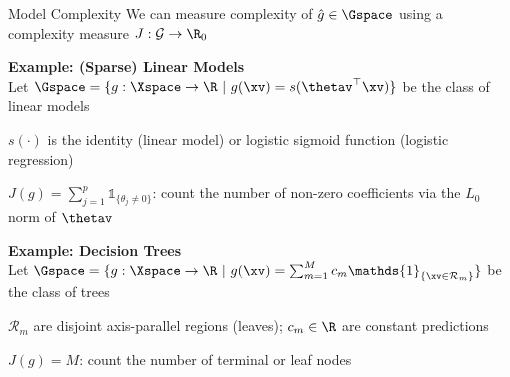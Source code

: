 \documentclass[10pt,compress,t,notes=noshow, xcolor=table]{beamer}
\newcommand{\gh}{\hat{g}}
\begin{document}
\begin{framev}[align=top]{Model Complexity}
We can measure complexity of $\gh \in \Gspace$ using a complexity measure $J: \mathcal{G} \to \R_0$ \lz %
\begin{itemizeM}
\item \textbf{Example: (Sparse) Linear Models}\\
Let $\Gspace = \{g: \Xspace \to \R ~|~ g(\xv) = s(\thetav^\top \xv)\}$ be the class of linear models
\begin{itemizeS}
\item $s(\cdot)$ is the identity (linear model) or logistic sigmoid function (logistic regression)
\item[$\leadsto$] $J(g) = \sum_{j = 1}^p \mathds{1}_{\{\theta_j \neq 0\}}$: count the number of non-zero coefficients via the $L_0$ norm of $\thetav$
\end{itemizeS}
\pause
\item \textbf{Example: Decision Trees}\\
Let $\Gspace = \{g: \Xspace \to \R ~|~ g(\xv) = \sum_{m=1}^M c_m \mathds{1}_{\{\xv \in \mathcal{R}_m\}}\}$ be the class of trees
\begin{itemizeS}
\item $\mathcal{R}_m$ are disjoint axis-parallel regions (leaves); $c_m \in \R$ are constant predictions
\item[$\leadsto$] $J(g) = M$: count the number of terminal or leaf nodes
\end{itemizeS}
\end{itemizeM}
\end{framev}
 
\end{document}
